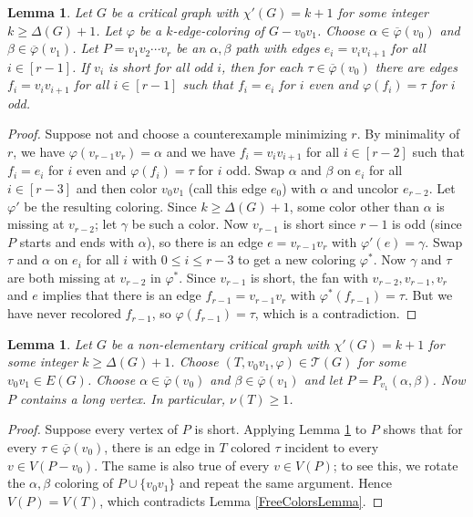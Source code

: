 \documentclass[12pt]{amsart}
\theoremstyle{plain}
\newtheorem{lem}[thm]{Lemma}
\theoremstyle{definition}
\theoremstyle{remark}
\newcommand{\fancy}[1]{\mathcal{#1}}
\newcommand{\T}{\fancy{T}}
\newcommand{\vph}{\varphi}
\newcommand{\vphn}{\overline{\varphi}}
\begin{document}
\begin{lem}\label{SpecialPath}
Let $G$ be a critical graph with $\chi'(G) = k+1$ for some integer $k \ge
\Delta(G) + 1$.  Let $\vph$ be a $k$-edge-coloring of $G-v_0v_1$.  Choose
$\alpha \in \vphn(v_0)$ and $\beta \in \vphn(v_1)$.  Let $P = v_1v_2\cdots v_r$
be an $\alpha,\beta$ path with edges $e_i = v_iv_{i+1}$ for all $i\in[r-1]$. 
If $v_i$ is short for all odd $i$, then for each $\tau \in \vphn(v_0)$ there
are edges $f_i = v_iv_{i+1}$ for all $i\in[r-1]$ such that $f_i = e_i$ for $i$
even and $\vph(f_i) = \tau$ for $i$ odd.
\end{lem}
\begin{proof}
Suppose not and choose a counterexample minimizing $r$.  By minimality of
$r$, we have $\vph(v_{r-1}v_r) = \alpha$ and we have $f_i = v_iv_{i+1}$ for
all $i\in[r-2]$ such that $f_i = e_i$ for $i$ even and $\vph(f_i) = \tau$ for
$i$ odd.  Swap $\alpha$ and $\beta$ on $e_i$ for all $i\in [r-3]$ and then
color $v_0v_1$ (call this edge $e_0$) with $\alpha$ and uncolor $e_{r-2}$.  Let
$\vph'$ be the resulting coloring.  Since $k \ge \Delta(G) + 1$, some color
other than $\alpha$ is missing at $v_{r-2}$; let $\gamma$ be such a color.  Now 
$v_{r-1}$ is short since $r-1$ is odd (since $P$ starts and ends with
$\alpha$), so there is an edge $e = v_{r-1}v_r$ with $\vph'(e) = \gamma$.  
Swap $\tau$ and $\alpha$ on $e_i$ for all $i$ with $0 \le i \le r-3$ to get a
new coloring $\vph^*$.  Now $\gamma$ and $\tau$ are both missing at $v_{r-2}$
in $\vph^*$.  Since $v_{r-1}$ is short, the fan with $v_{r-2}, v_{r-1}, v_r$
and $e$ implies that there is an edge $f_{r-1} = v_{r-1}v_r$ with
$\vph^*(f_{r-1}) = \tau$.  But we have never recolored $f_{r-1}$, so
$\vph(f_{r-1})=\tau$, which is a contradiction.
\end{proof}

\begin{lem}\label{ZeroNonSpecial}
Let $G$ be a non-elementary critical graph with $\chi'(G) = k+1$ for some
integer $k \ge \Delta(G) + 1$.  Choose $(T, v_0v_1, \vph) \in \T(G)$ for some
$v_0v_1 \in E(G)$.  Choose $\alpha \in \vphn(v_0)$ and $\beta \in \vphn(v_1)$ and
let $P = P_{v_1}(\alpha, \beta)$.  Now $P$ contains a long vertex. 
In particular, $\nu(T) \ge 1$.
\label{lem2}
\end{lem}
\begin{proof}
Suppose every vertex of $P$ is short.  Applying Lemma \ref{SpecialPath} to $P$
shows that for every $\tau \in \vphn(v_0)$, there is an edge in $T$ colored
$\tau$ incident to every $v \in V(P - v_0)$.  The same is also true of every $v
\in V(P)$; to see this, we rotate the $\alpha,\beta$ coloring of
$P\cup\{v_0v_1\}$ and repeat the same argument.  Hence $V(P) = V(T)$, which
contradicts Lemma \ref{FreeColorsLemma}.
\end{proof}
\end{document}
